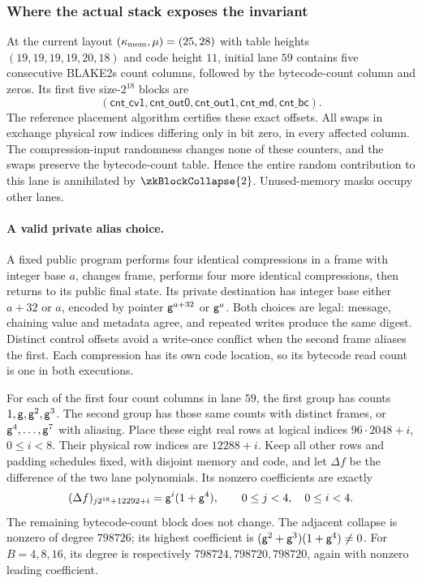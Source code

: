 \subsubsection{Where the actual stack exposes the invariant}

At the current layout $(\kappa_{\mathrm{mem}},\mu)=(25,28)$ with table heights $(19,19,19,19,20,18)$ and code height $11$, initial lane $59$ contains five consecutive BLAKE2s count columns, followed by the bytecode-count column and zeros. Its first five size-$2^{18}$ blocks are
\[
 (\mathsf{cnt\_cv1},\mathsf{cnt\_out0},\mathsf{cnt\_out1},
   \mathsf{cnt\_md},\mathsf{cnt\_bc}).
\]
The reference placement algorithm certifies these exact offsets. All swaps in  exchange physical row indices differing only in bit zero, in every affected column. The compression-input randomness changes none of these counters, and the swaps preserve the bytecode-count table. Hence the entire random contribution to this lane is annihilated by $\zkBlockCollapse{2}$. Unused-memory masks occupy other lanes.

\paragraph{A valid private alias choice.} A fixed public program performs four identical compressions in a frame with integer base $a$, changes frame, performs four more identical compressions, then returns to its public final state. Its private destination has integer base either $a+32$ or $a$, encoded by pointer $\mathsf{g}^{a+32}$ or $\mathsf{g}^a$. Both choices are legal: message, chaining value and metadata agree, and repeated writes produce the same digest. Distinct control offsets avoid a write-once conflict when the second frame aliases the first. Each compression has its own code location, so its bytecode read count is one in both executions.

For each of the first four count columns in lane $59$, the first group has counts $1,\mathsf{g},\mathsf{g}^2,\mathsf{g}^3$. The second group has those same counts with distinct frames, or $\mathsf{g}^4,\ldots,\mathsf{g}^7$ with aliasing. Place these eight real rows at logical indices $96\cdot2048+i$, $0\le i<8$. Their physical row indices are $12288+i$. Keep all other rows and padding schedules fixed, with disjoint memory and code, and let $\Delta f$ be the difference of the two lane polynomials. Its nonzero coefficients are exactly
\[
 (\Delta f)_{j2^{18}+12292+i}=\mathsf{g}^i(1+\mathsf{g}^4),
 \qquad 0\le j<4,\quad 0\le i<4.
\]
The remaining bytecode-count block does not change. The adjacent collapse is nonzero of degree $798726$; its highest coefficient is $(\mathsf{g}^2+\mathsf{g}^3)(1+\mathsf{g}^4)\ne0$. For $B=4,8,16$, its degree is respectively $798724,798720,798720$, again with nonzero leading coefficient.

